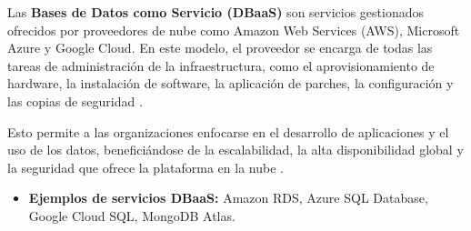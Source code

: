 Las \textbf{Bases de Datos como Servicio (DBaaS)} son servicios gestionados ofrecidos por proveedores de nube como Amazon Web Services (AWS), Microsoft Azure y Google Cloud. En este modelo, el proveedor se encarga de todas las tareas de administración de la infraestructura, como el aprovisionamiento de hardware, la instalación de software, la aplicación de parches, la configuración y las copias de seguridad \cite{azure2024dbaas}.

Esto permite a las organizaciones enfocarse en el desarrollo de aplicaciones y el uso de los datos, beneficiándose de la escalabilidad, la alta disponibilidad global y la seguridad que ofrece la plataforma en la nube \cite{amazon2024rds}.
\begin{itemize}
    \item \textbf{Ejemplos de servicios DBaaS:} Amazon RDS, Azure SQL Database, Google Cloud SQL, MongoDB Atlas.
\end{itemize}